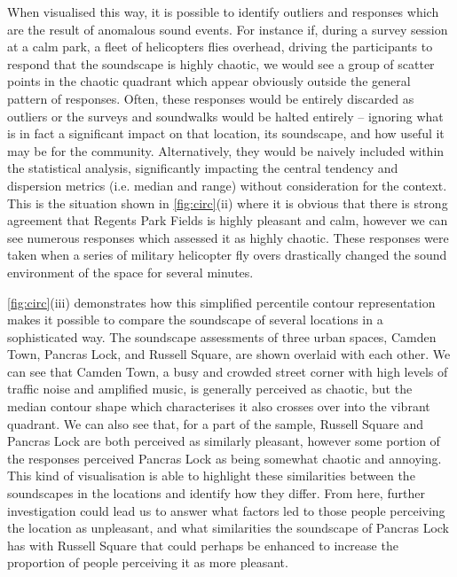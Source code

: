 When visualised this way, it is possible to identify outliers and responses which are the result of anomalous sound events. For instance if, during a survey session at a calm park, a fleet of helicopters flies overhead, driving the participants to respond that the soundscape is highly chaotic, we would see a group of scatter points in the chaotic quadrant which appear obviously outside the general pattern of responses. Often, these responses would be entirely discarded as outliers or the surveys and soundwalks would be halted entirely -- ignoring what is in fact a significant impact on that location, its soundscape, and how useful it may be for the community. Alternatively, they would be naively included within the statistical analysis, significantly impacting the central tendency and dispersion metrics (i.e. median and range) without consideration for the context. This is the situation shown in \cref{fig:circ}(ii) where it is obvious that there is strong agreement that Regents Park Fields is highly pleasant and calm, however we can see numerous responses which assessed it as highly chaotic. These responses were taken when a series of military helicopter fly overs drastically changed the sound environment of the space for several minutes.

\cref{fig:circ}(iii) demonstrates how this simplified  percentile contour representation makes it possible to compare the soundscape of several locations in a sophisticated way. The soundscape assessments of three urban spaces, Camden Town, Pancras Lock, and Russell Square, are shown overlaid with each other. We can see that Camden Town, a busy and crowded street corner with high levels of traffic noise and amplified music, is generally perceived as chaotic, but the median contour shape which characterises it also crosses over into the vibrant quadrant. We can also see that, for a part of the sample, Russell Square and Pancras Lock are both perceived as similarly pleasant, however some portion of the responses perceived Pancras Lock as being somewhat chaotic and annoying. This kind of visualisation is able to highlight these similarities between the soundscapes in the locations and identify how they differ. From here, further investigation could lead us to answer what factors led to those people perceiving the location as unpleasant, and what similarities the soundscape of Pancras Lock has with Russell Square that could perhaps be enhanced to increase the proportion of people perceiving it as more pleasant.


